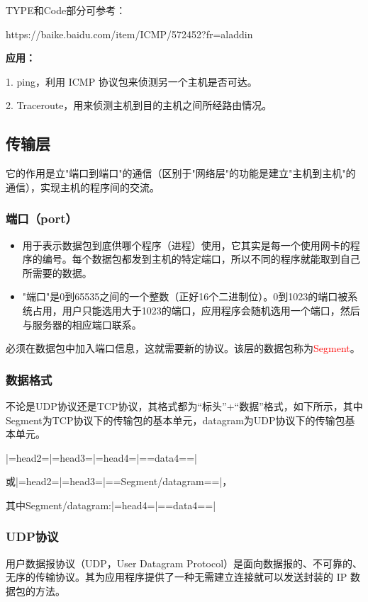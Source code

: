 \documentclass[UTF8]{article}%
\begin{document}
TYPE和Code部分可参考：

https://baike.baidu.com/item/ICMP/572452?fr=aladdin 

\textbf{应用：}

1. ping，利用 ICMP 协议包来侦测另一个主机是否可达。

2. Traceroute，用来侦测主机到目的主机之间所经路由情况。


\subsection{传输层}

它的作用是立"端口到端口"的通信（区别于"网络层"的功能是建立"主机到主机"的通信），实现主机的程序间的交流。

\subsubsection{端口（port）}

\begin{itemize}
    \item 用于表示数据包到底供哪个程序（进程）使用，它其实是每一个使用网卡的程序的编号。每个数据包都发到主机的特定端口，所以不同的程序就能取到自己所需要的数据。
    \item "端口"是0到65535之间的一个整数（正好16个二进制位）。0到1023的端口被系统占用，用户只能选用大于1023的端口，应用程序会随机选用一个端口，然后与服务器的相应端口联系。
\end{itemize}

必须在数据包中加入端口信息，这就需要新的协议。该层的数据包称为\textcolor{red}{Segment}。

\subsubsection{数据格式}

不论是UDP协议还是TCP协议，其格式都为“标头”+“数据”格式，如下所示，其中Segment为TCP协议下的传输包的基本单元，datagram为UDP协议下的传输包基本单元。

|=head2=|=head3=|=head4=|==data4==|
    
或|=head2=|=head3=|==Segment/datagram==|，

其中Segment/datagram:|=head4=|==data4==|

\subsubsection{UDP协议}

用户数据报协议（UDP，User Datagram Protocol）是面向数据报的、不可靠的、无序的传输协议。其为应用程序提供了一种无需建立连接就可以发送封装的 IP 数据包的方法。
\end{document}
